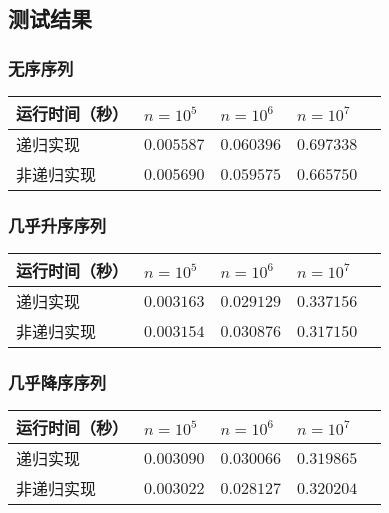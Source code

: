 \documentclass[12pt]{article}
\begin{document}
\subsection{测试结果}


\subsubsection{无序序列}

\begin{center}
    \begin{tabular}{|m{}|m{}|m{}|m{}|m{}|}
    \hline
    运行时间（秒） & $n=10^5$ & $n=10^6$ & $n=10^7$ \\ 
    \hline
    递归实现 & $0.005587$ & $0.060396$ & $0.697338$ \\ 
    \hline
    非递归实现 & $0.005690$ & $0.059575$ & $0.665750$ \\ 
    \hline
    \end{tabular}
  \end{center}
  
\subsubsection{几乎升序序列}

\begin{center}
  \begin{tabular}{|m{}|m{}|m{}|m{}|m{}|}
  \hline
  运行时间（秒） & $n=10^5$ & $n=10^6$ & $n=10^7$ \\ 
  \hline
  递归实现 & $0.003163$ & $0.029129$ & $0.337156$ \\ 
  \hline
  非递归实现 & $0.003154$ & $0.030876$ & $0.317150$ \\ 
  \hline
  \end{tabular}
\end{center}

\subsubsection{几乎降序序列}

\begin{center}
  \begin{tabular}{|m{}|m{}|m{}|m{}|m{}|}
  \hline
  运行时间（秒） & $n=10^5$ & $n=10^6$ & $n=10^7$ \\ 
  \hline
  递归实现 & $0.003090$ & $0.030066$ & $0.319865$ \\ 
  \hline
  非递归实现 & $0.003022$ & $0.028127$ & $0.320204$ \\ 
  \hline
  \end{tabular}
\end{center}
\end{document}
